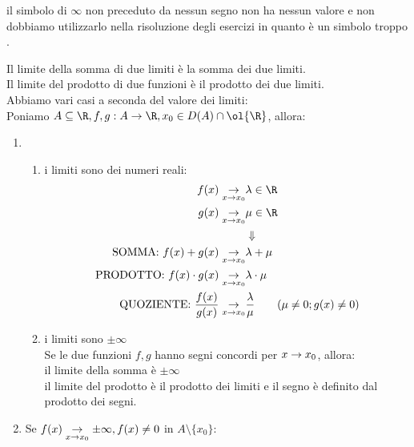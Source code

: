 \documentclass[../analisi.tex]{subfiles}
\begin{document}
\begin{Large}
	 il simbolo di $ \infty $ non preceduto da nessun segno non
	ha nessun valore e non dobbiamo utilizzarlo nella risoluzione degli 
	esercizi in quanto è un simbolo troppo .
\end{Large}


\begin{defn}
Il limite della somma di due limiti è la somma dei due limiti.\\
Il limite del prodotto di due funzioni è il prodotto dei due limiti.\\
Abbiamo vari casi a seconda del valore dei limiti:\\
Poniamo $ \acr, f,g: A \to \R, x_0 \in D(A) \cap \ol{\R} $, allora:

\begin{enumerate}[label*=\arabic*.]

	\item	 
	\begin{enumerate}[label=\Alph*.]
	\item i limiti sono dei numeri reali:\\
		
		\begin{equation}
		\begin{aligned}
		f(x) \txtx &\lambda \in \R\\
		g(x) \txtx &\mu \in \R\\
			   &\Downarrow\\
		\mbox{SOMMA:}\ f(x)+g(x) \txtx& \lambda+\mu\\
		\mbox{PRODOTTO:}\ f(x)\cdot g(x) \txtx& \lambda \cdot \mu\\
		\mbox{QUOZIENTE:}\ \frac{f(x)}{g(x)} \txtx& 
		\frac{\lambda}{\mu} \qquad (\mu \neq 0; g(x) \neq 0)
		\end{aligned}
		\end{equation}
	\item i limiti sono $ \pm \infty $\\
		Se le due funzioni $f,g$ hanno segni concordi per $x \to x_0$, allora:\\ 
		il limite della somma è $ \pm \infty $\\
		il limite del prodotto è il prodotto dei limiti e il segno è 
		definito dal prodotto dei segni.
	\end{enumerate}

\item Se $f(x) \underset{x \to x_0}{\to} \pm \infty, f(x) \neq 0 $ in $A\setminus\{x_0\}$:
		

\end{enumerate}
\end{defn}
\end{document}
